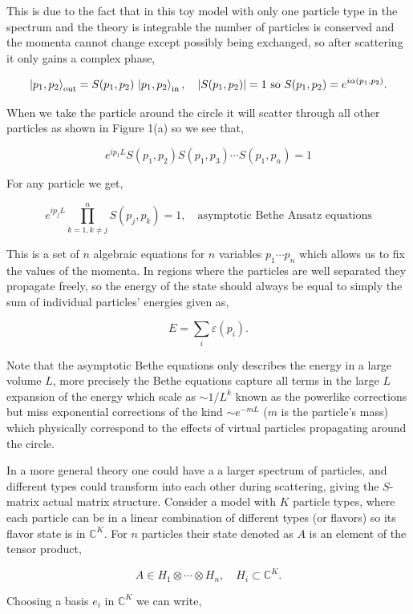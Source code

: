 \documentclass{article}
\begin{document}
This is due to the fact that in this toy model with only one particle type in the spectrum and the theory is integrable the number of particles is conserved and the momenta cannot change except possibly being exchanged, so after scattering it only gains a complex phase, 

\[\ket{p_1,p_2}_{\text{out}} = S(p_1, p_2)\,\ket{p_1, p_2}_{\text{in}}, \quad |S(p_1, p_2)| = 1 \text{ so } S(p_1, p_2) = e^{i\alpha(p_1, p_2)}.\]

When we take the particle around the circle it will scatter through all other particles as shown in Figure 1(a) so we see that,

\[e^{ip_1 L} S(p_1,p_2)S(p_1,p_3)\cdots S(p_1,p_n) = 1\]

For any particle we get,

\[e^{ip_jL}\prod_{k=1,k\neq j}^n S(p_j,p_k) = 1, \quad \text{asymptotic Bethe Ansatz equations}\]

This is a set of $n$ algebraic equations for $n$ variables $p_1\cdots p_n$ which allows us to fix the values of the momenta. In regions where the particles are well separated they propagate freely, so the energy of the state should always be equal to simply the sum of individual particles’ energies given as,

\[E = \sum_i \varepsilon(p_i).\]

Note that the asymptotic Bethe equations only describes the energy in a large volume $L$, more precisely the Bethe equations capture all terms in the large $L$ expansion of the energy which scale as $\sim 1/L^k$ known as the powerlike corrections but miss exponential corrections of the kind $\sim e^{-mL}$ ($m$ is the particle's mass) which physically correspond to the effects of virtual particles propagating around the circle. %

In a more general theory one could have a a larger spectrum of particles, and different types could transform into each other during scattering, giving the $S$-matrix actual matrix structure. Consider a model with $K$ particle types, where each particle can be in a linear combination of different types (or flavors) so its flavor state is in $\mathbb{C}^K$. For $n$ particles their state denoted as $A$ is an element of the tensor product,

\[A\in H_1\otimes \cdots \otimes H_n, \quad H_i \subset \mathbb{C}^K.\]

Choosing a basis $e_i$ in $\mathbb{C}^K$ we can write,
\end{document}
